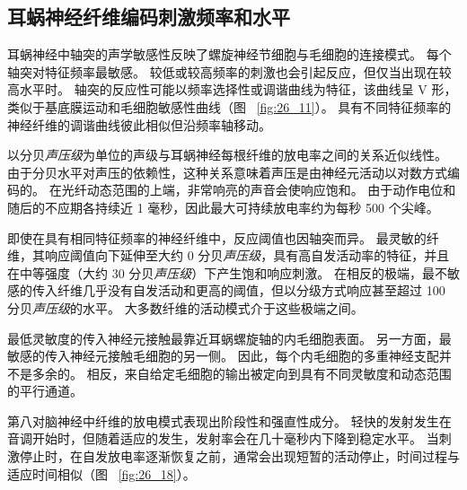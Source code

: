 \subsection{耳蜗神经纤维编码刺激频率和水平}

耳蜗神经中轴突的声学敏感性反映了螺旋神经节细胞与毛细胞的连接模式。
每个轴突对特征频率最敏感。
较低或较高频率的刺激也会引起反应，但仅当出现在较高水平时。
轴突的反应性可能以频率选择性或调谐曲线为特征，该曲线呈 V 形，类似于基底膜运动和毛细胞敏感性曲线（图 ~\ref{fig:26_11}）。
具有不同特征频率的神经纤维的调谐曲线彼此相似但沿频率轴移动。


以分贝\textit{声压级}为单位的声级与耳蜗神经每根纤维的放电率之间的关系近似线性。
由于分贝水平对声压的依赖性，这种关系意味着声压是由神经元活动以对数方式编码的。
在光纤动态范围的上端，非常响亮的声音会使响应饱和。
由于动作电位和随后的不应期各持续近 1 毫秒，因此最大可持续放电率约为每秒 500 个尖峰。


即使在具有相同特征频率的神经纤维中，反应阈值也因轴突而异。 最灵敏的纤维，其响应阈值向下延伸至大约 0 分贝\textit{声压级}，具有高自发活动率的特征，并且在中等强度（大约 30 分贝\textit{声压级}）下产生饱和响应刺激。
在相反的极端，最不敏感的传入纤维几乎没有自发活动和更高的阈值，但以分级方式响应甚至超过 100 分贝\textit{声压级}的水平。
大多数纤维的活动模式介于这些极端之间。


最低灵敏度的传入神经元接触最靠近耳蜗螺旋轴的内毛细胞表面。
另一方面，最敏感的传入神经元接触毛细胞的另一侧。
因此，每个内毛细胞的多重神经支配并不是多余的。
相反，来自给定毛细胞的输出被定向到具有不同灵敏度和动态范围的平行通道。


第八对脑神经中纤维的放电模式表现出阶段性和强直性成分。
轻快的发射发生在音调开始时，但随着适应的发生，发射率会在几十毫秒内下降到稳定水平。
当刺激停止时，在自发放电率逐渐恢复之前，通常会出现短暂的活动停止，时间过程与适应时间相似（图 ~\ref{fig:26_18}）。


